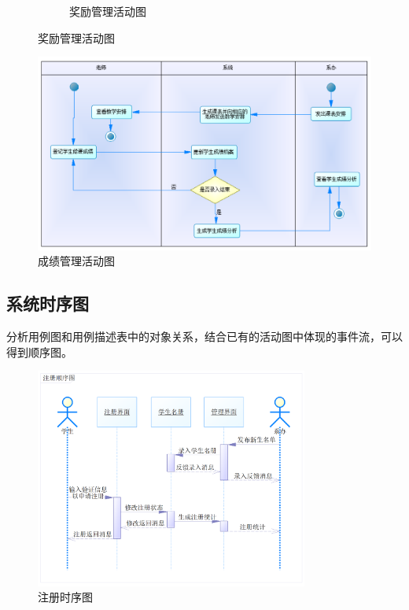 \documentclass[12pt, a4paper, oneside]{ctexart}
\begin{document}
\begin{figure}[H]
\begin{subfigure}{0.5\linewidth}
        \caption{奖励管理活动图}
    \end{subfigure}
\end{figure}

\begin{figure}[H]
    \centering
    \includegraphics[width = 1\textwidth]{../pic/3/3.4.png}
    \caption{成绩管理活动图}
\end{figure}

\subsection{系统时序图}

分析用例图和用例描述表中的对象关系，结合已有的活动图中体现的事件流，可以得到顺序图。

\begin{figure}[H]
    \centering
    \includegraphics[width = 0.8\textwidth]{../pic/3/3.5.png}
    \caption{注册时序图}
\end{figure}
\end{document}
